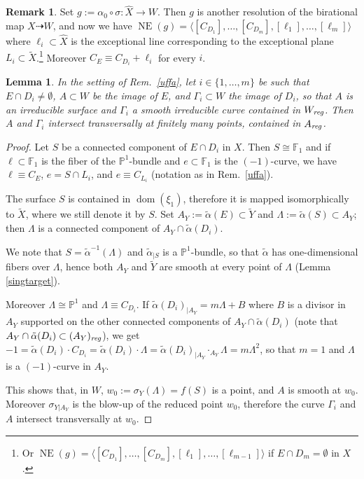 \documentclass[a4paper,12pt]{amsart}
\newtheorem{lemma}[thm]{Lemma}
\theoremstyle{definition}
\newtheorem{remark}[thm]{Remark}
\numberwithin{figure}{section}
\numberwithin{table}{section}
\newcommand{\w}{\widetilde}
\newcommand{\wi}{\widehat}
\newcommand{\pr}{\mathbb{P}}
\newcommand{\dom}{\operatorname{dom}}
\newcommand{\NE}{\operatorname{NE}}
\newcommand{\reg}{\text{\it reg}}
\begin{document}
\begin{remark}
 Set $g:=\alpha_0\circ\sigma\colon \wi{X}\to W$. Then $g$ is another resolution of the birational map $X\dasharrow W$, and now we have $\NE(g)=\langle [C_{D_1}],\dotsc,[C_{D_m}],[\ell_1],\dotsc,[\ell_m]\rangle$ where $\ell_i\subset\wi{X}$ is the exceptional line corresponding to the exceptional plane $L_i\subset\w{X}$.\footnote{Or  $\NE(g)=\langle [C_{D_1}],\dotsc,[C_{D_m}],[\ell_1],\dotsc,[\ell_{m-1}]\rangle$ if $E\cap D_m=\emptyset$ in $X$.} Moreover $C_E\equiv C_{D_i}+\ell_i$ for every $i$.
\end{remark}
\begin{lemma}\label{carolina}
  In the setting of Rem.~\ref{uffa}, let $i\in\{1,\dotsc,m\}$ be such that $E\cap D_i\neq\emptyset$,
  $A\subset W$ be the image of $E$, and $\Gamma_i\subset W$ the image of $D_i$, so that $A$ is an irreducible surface and $\Gamma_i$ a smooth irreducible curve contained in $W_{\reg}$. Then $A$ and $\Gamma_i$ intersect transversally at finitely many points, contained in $A_{\reg}$.
\end{lemma}
\begin{proof}
Let $S$ be a connected component of $E\cap D_i$ in $X$. Then $S\cong\mathbb{F}_1$ and if $\ell\subset\mathbb{F}_1$ is the fiber of the $\pr^1$-bundle and $e\subset\mathbb{F}_1$ is the $(-1)$-curve, we have $\ell\equiv C_E$, $e=S\cap L_i$, and $e\equiv C_{L_i}$ (notation as in Rem.~\ref{uffa}).

The surface $S$ is contained in $\dom(\xi_1)$, therefore it is mapped isomorphically to $\w{X}$, where we still denote it by $S$. Set $A_Y:=\tilde\alpha(E)\subset\w{Y}$ and $\Lambda:=\tilde\alpha(S)\subset A_Y$;
then $\Lambda$ is a connected component of $A_Y\cap \tilde\alpha(D_i)$.

We note that $S=\tilde\alpha^{-1}(\Lambda)$ and $\tilde\alpha_{|S}$ is a $\pr^1$-bundle, so that $\tilde\alpha$ has one-dimensional fibers over $\Lambda$, hence both $A_Y$ and $\w{Y}$  are smooth at every point of $\Lambda$
(Lemma \ref{singtarget}).

Moreover $\Lambda\cong\pr^1$ and $\Lambda\equiv C_{D_i}$. If $\tilde\alpha(D_i)_{|A_Y}=m\Lambda+B$ where $B$ is a divisor in $A_Y$ supported on the other connected components of $A_Y\cap \tilde\alpha(D_i)$ (note that $A_Y\cap \tilde\alpha(D_i)\subset (A_Y)_{\reg}$), we get $-1=\tilde\alpha(D_i)\cdot C_{D_i}=\tilde\alpha(D_i)\cdot \Lambda=\tilde\alpha(D_i)_{|A_Y}\cdot_{A_Y} \Lambda=m\Lambda^2$, so that $m=1$ and $\Lambda$ is a $(-1)$-curve in $A_Y$.

This shows that, in $W$, $w_0:=\sigma_Y(\Lambda)=f(S)$ is a point, and $A$ is smooth at $w_0$. Moreover $\sigma_{Y|A_Y}$ is the blow-up of the reduced point $w_0$, therefore the curve $\Gamma_i$ and $A$ intersect transversally at $w_0$.
\end{proof}  
\end{document}
